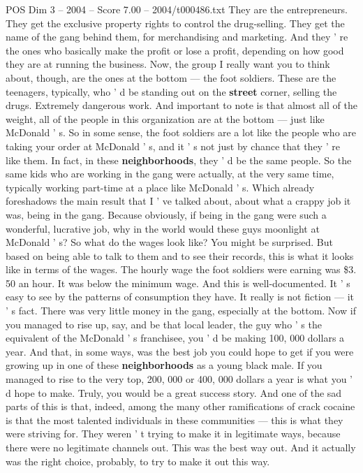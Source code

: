 \begin{textsample}{POS Dim 3 – 2004 – Score 7.00 – 2004/t000486.txt}
They are the entrepreneurs.
They get the exclusive property rights to control the drug-selling.
They get the name of the gang behind them, for merchandising and marketing.
And they ' re the ones who basically make the profit or lose a profit, depending on how good they are at running the business.
Now, the group I really want you to think about, though, are the ones at the bottom — the foot soldiers.
These are the teenagers, typically, who ' d be standing out on the \textbf{street} corner, selling the drugs.
Extremely dangerous work.
And important to note is that almost all of the weight, all of the people in this organization are at the bottom — just like McDonald ' s.
So in some sense, the foot soldiers are a lot like the people who are taking your order at McDonald ' s, and it ' s not just by chance that they ' re like them.
In fact, in these \textbf{neighborhoods}, they ' d be the same people.
So the same kids who are working in the gang were actually, at the very same time, typically working part-time at a place like McDonald ' s.
Which already foreshadows the main result that I ' ve talked about, about what a crappy job it was, being in the gang.
Because obviously, if being in the gang were such a wonderful, lucrative job, why in the world would these guys moonlight at McDonald ' s?
So what do the wages look like?
You might be surprised.
But based on being able to talk to them and to see their records, this is what it looks like in terms of the wages.
The hourly wage the foot soldiers were earning was \$3. 50 an hour.
It was below the minimum wage.
And this is well-documented.
It ' s easy to see by the patterns of consumption they have.
It really is not fiction — it ' s fact.
There was very little money in the gang, especially at the bottom.
Now if you managed to rise up, say, and be that local leader, the guy who ' s the equivalent of the McDonald ' s franchisee, you ' d be making 100, 000 dollars a year.
And that, in some ways, was the best job you could hope to get if you were growing up in one of these \textbf{neighborhoods} as a young black male.
If you managed to rise to the very top, 200, 000 or 400, 000 dollars a year is what you ' d hope to make.
Truly, you would be a great success story.
And one of the sad parts of this is that, indeed, among the many other ramifications of crack cocaine is that the most talented individuals in these communities — this is what they were striving for.
They weren ' t trying to make it in legitimate ways, because there were no legitimate channels out.
This was the best way out.
And it actually was the right choice, probably, to try to make it out this way.

\end{textsample}
